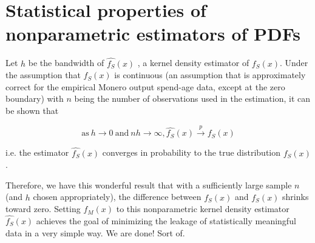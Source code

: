 \documentclass[english]{paper}
\begin{document}
\section{Statistical properties of nonparametric estimators of PDFs}

Let $h$ be the bandwidth of $\hat{f_{S}}(x)$ , a kernel density
estimator of $f_{S}(x)$. Under the assumption that $f_{S}(x)$ is
continuous (an assumption that is approximately correct for the empirical
Monero output spend-age data, except at the zero boundary) with $n$
being the number of observations used in the estimation, it can be
shown that

\begin{equation}
\mathrm{as\:}h\rightarrow0\mathrm{\:and\:}nh\rightarrow\infty,\hat{f_{S}}(x)\overset{p}{\longrightarrow}f_{S}(x)
\end{equation}

i.e. the estimator $\hat{f_{S}}(x)$ converges in probability to the
true distribution $f_{S}(x)$.

Therefore, we have this wonderful result that with a sufficiently
large sample $n$ (and $h$ chosen appropriately), the difference
between $\hat{f_{S}}(x)$ and $f_{S}(x)$ shrinks toward zero. Setting
$f_{M}(x)$ to this nonparametric kernel density estimator $\hat{f_{S}}(x)$
achieves the goal of minimizing the leakage of statistically meaningful
data in a very simple way. We are done! Sort of.
\end{document}
